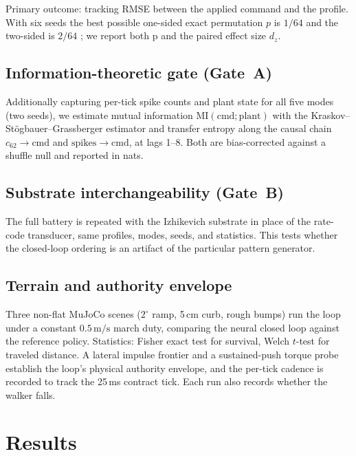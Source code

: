 Primary outcome: tracking RMSE between the applied command and the profile. With
six seeds the best possible one-sided exact permutation $p$ is $1/64$ and the
two-sided is $2/64$ \cite{ernst2004}; we report both p and the paired effect
size $d_z$.

\subsection{Information-theoretic gate (Gate~A)}

Additionally capturing per-tick spike counts and plant state for all five modes
(two seeds), we estimate mutual information $\mathrm{MI}(\mathrm{cmd};\mathrm{plant})$
with the Kraskov--St\"ogbauer--Grassberger estimator \cite{kraskov2004} and
transfer entropy \cite{schreiber2000} along the causal chain
$c_{62}\rightarrow\mathrm{cmd}$ and
$\mathrm{spikes}\rightarrow\mathrm{cmd}$, at lags 1--8. Both are
bias-corrected against a shuffle null
\cite{panzeri2007,walker2018} and reported in nats.

\subsection{Substrate interchangeability (Gate~B)}

The full battery is repeated with the Izhikevich substrate in place of the
rate-code transducer, same profiles, modes, seeds, and statistics. This tests
whether the closed-loop ordering is an artifact of the particular pattern
generator.

\subsection{Terrain and authority envelope}

Three non-flat MuJoCo scenes ($2^{\circ}$ ramp, 5\,cm curb, rough bumps) run the loop
under a constant $0.5\,\mathrm{m/s}$ march duty, comparing the neural closed
loop against the reference policy. Statistics: Fisher exact test for survival,
Welch $t$-test for traveled distance. A lateral impulse frontier and a
sustained-push torque probe establish the loop's physical authority envelope,
and the per-tick cadence is recorded to track the 25\,ms contract tick.
Each run also records whether the walker falls.

\section{Results}


